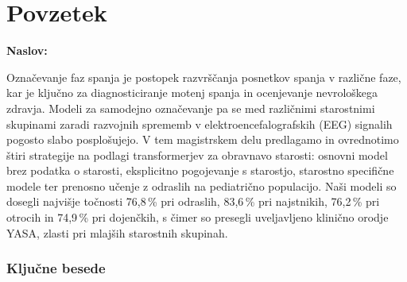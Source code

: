 \chapter*{Povzetek}

\noindent\textbf{Naslov:} \ttitle
\bigskip

Označevanje faz spanja je postopek razvrščanja posnetkov spanja v različne faze,
kar je ključno za diagnosticiranje motenj spanja in ocenjevanje nevrološkega zdravja.
Modeli za samodejno označevanje pa se med različnimi
starostnimi skupinami zaradi razvojnih sprememb v
elektroencefalografskih (EEG) signalih pogosto slabo posplošujejo.
V tem magistrskem delu predlagamo in ovrednotimo štiri
strategije na podlagi transformerjev za obravnavo starosti: osnovni model brez
podatka o starosti, eksplicitno pogojevanje s starostjo, starostno specifične
modele ter prenosno učenje z odraslih na pediatrično populacijo. Naši modeli so
dosegli najvišje točnosti 76,8\,\% pri odraslih, 83,6\,\% pri najstnikih, 76,2\,\%
pri otrocih in 74,9\,\% pri dojenčkih, s čimer so presegli uveljavljeno klinično
orodje YASA, zlasti pri mlajših starostnih skupinah.

\subsection*{Ključne besede}
\textit{\tkeywords}
\clearemptydoublepage